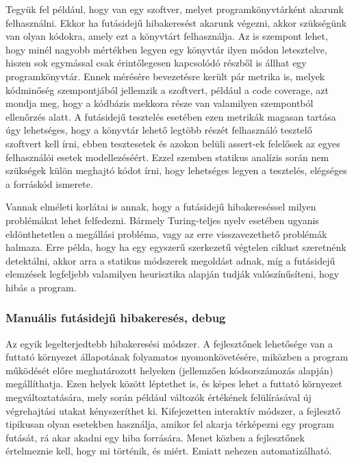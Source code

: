 \documentclass[a4paper,12pt]{report}
\begin{document}
Tegyük fel például, hogy van egy szoftver, melyet programkönyvtárként akarunk felhasználni. Ekkor ha futásidejű hibakeresést akarunk végezni, akkor szükségünk van olyan kódokra, amely ezt a könyvtárt felhasználja. Az is szempont lehet, hogy minél nagyobb mértékben legyen egy könyvtár ilyen módon letesztelve, hiszen sok egymással csak érintőlegesen kapcsolódó részből is állhat egy programkönyvtár. Ennek mérésére bevezetésre került pár metrika is, melyek kódminőség szempontjából jellemzik a szoftvert, például a code coverage, azt mondja meg, hogy a kódbázis mekkora része van valamilyen szempontból ellenőrzés alatt. A futásidejű tesztelés esetében ezen metrikák magasan tartása úgy lehetséges, hogy a könyvtár lehető legtöbb részét felhasználó tesztelő szoftvert kell írni, ebben tesztesetek és azokon belüli assert-ek felelősek az egyes felhasználói esetek modellezéséért. Ezzel szemben statikus analízis során nem szükségek külön meghajtó kódot írni, hogy lehetséges legyen a tesztelés, elégséges a forráskód ismerete.

Vannak elméleti korlátai is annak, hogy a futásidejű hibakereséssel milyen problémákat lehet felfedezni. Bármely Turing-teljes nyelv esetében ugyanis eldönthetetlen a megállási probléma, vagy az erre visszavezethető problémák halmaza. Erre példa, hogy ha egy egyszerű szerkezetű végtelen ciklust szeretnénk detektálni, akkor arra a statikus módszerek megoldást adnak, míg a futásidejű elemzések legfeljebb valamilyen heurisztika alapján tudják valószínűsíteni, hogy hibás a program.

\subsubsection{Manuális futásidejű hibakeresés, debug}
Az egyik legelterjedtebb hibakeresési módszer. A fejlesztőnek lehetősége van a futtató környezet állapotának folyamatos nyomonkövetésére, miközben a program működését előre meghatározott helyeken (jellemzően kódsorszámozás alapján) megállíthatja. Ezen helyek között léptethet is, és képes lehet a futtató környezet megváltoztatására, mely során például változók értékének felülírásával új végrehajtási utakat kényszeríthet ki. Kifejezetten interaktív módszer, a fejlesztő tipikusan olyan esetekben használja, amikor fel akarja térképezni egy program futását, rá akar akadni egy hiba forrására. Menet közben a fejlesztőnek értelmeznie kell, hogy mi történik, és miért. Emiatt nehezen automatizálható.
\end{document}
